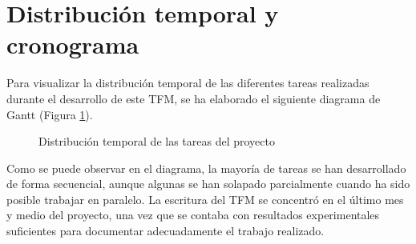 \section{Distribución temporal y cronograma} \label{sec:cronograma}

Para visualizar la distribución temporal de las diferentes tareas realizadas durante el desarrollo de este TFM, se ha elaborado el siguiente diagrama de Gantt (Figura \ref{fig:gantt}).

\begin{figure}[H]
    \centering
    \caption{Distribución temporal de las tareas del proyecto}
    \label{fig:gantt}
\end{figure}

Como se puede observar en el diagrama, la mayoría de tareas se han desarrollado de forma secuencial, aunque algunas se han solapado parcialmente cuando ha sido posible trabajar en paralelo. La escritura del TFM se concentró en el último mes y medio del proyecto, una vez que se contaba con resultados experimentales suficientes para documentar adecuadamente el trabajo realizado.